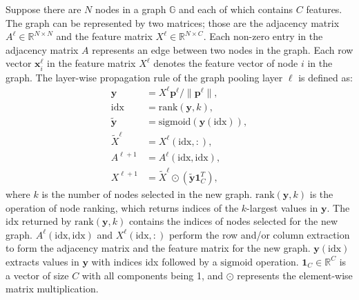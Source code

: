 \documentclass{article}
\begin{document}
Suppose there are $N$ nodes in a graph $\mathbb G$ and each of which
contains $C$ features. The graph can be represented by two matrices;
those are the adjacency matrix $A^{\ell} \in \mathbb{R}^{N \times N}
$ and the feature matrix $X^{\ell} \in \mathbb{R}^{N\times C}$. 
Each non-zero entry in the adjacency matrix $A$ represents an edge between two nodes in the graph.
Each row
vector $\mathbf{x}^{\ell}_i$ in the feature matrix $X^{\ell}$ denotes the feature
vector of node $i$ in the graph. The layer-wise propagation rule of the
graph pooling layer $\ell$ is defined as:
\begin{equation}
\begin{aligned}
  \mathbf y & = X^{\ell} \mathbf p^{\ell} / \lVert \mathbf p^{\ell} \rVert, \\
  \mbox{idx} &= \mbox{rank}(\mathbf y, k), \\
 \tilde{\mathbf y} &= \mbox{sigmoid} (\mathbf y(\mbox{idx})), \\
  \tilde X^{\ell} & = X^{\ell}(\mbox{idx}, :), \\
  A^{\ell+1} &= A^{\ell}(\mbox{idx}, \mbox{idx}), \\
  X^{\ell+1} &= \tilde X^{\ell} \odot \left(\tilde{\mathbf y} \mathbf{1}_C^{T}\right),
\end{aligned}\label{eq:gpool}
\end{equation}
where $k$ is the number of nodes selected in the new graph.
$\mbox{rank}(\mathbf y, k)$ is the operation of node ranking, which
returns indices of the $k$-largest values in $\mathbf y$. The
$\mbox{idx}$ returned by $\mbox{rank}(\mathbf y, k)$ contains the
indices of nodes selected for the new graph. $A^{\ell}(\mbox{idx},
\mbox{idx})$ and $X^{\ell}(\mbox{idx}, :)$ perform the row and/or
column extraction to form the adjacency matrix and the feature
matrix for the new graph. $\mathbf y(\mbox{idx})$ extracts values in
$\mathbf y$ with indices idx followed by a $\mbox{sigmoid}$ operation.
$\mathbf 1_{C}\in \mathbb{R}^{C}$ is a vector of size $C$ with all
components being 1, and $\odot$ represents the element-wise matrix
multiplication.
\end{document}
